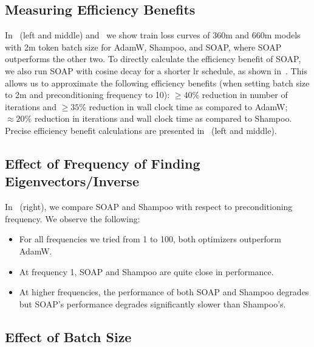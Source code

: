 \documentclass{article} %
\begin{document}
\subsection{Measuring Efficiency Benefits}



In~ (left and middle) and~ we show train loss curves of 360m and 660m models with 2m token batch size for AdamW, Shampoo, and SOAP, where SOAP outperforms the other two. To directly calculate the efficiency benefit of SOAP, we also run SOAP with cosine decay for a shorter lr schedule, as shown in~. This allows us to approximate the following efficiency benefits (when setting batch size to 2m and preconditioning frequency to 10): $\geq 40\%$ reduction in number of iterations and $\geq 35\%$ reduction in wall clock time as compared to AdamW; $\approx 20\%$ reduction in iterations and wall clock time as compared to Shampoo. Precise efficiency benefit calculations are presented in ~(left and middle).




\subsection{Effect of Frequency of Finding Eigenvectors/Inverse}
\label{sec:freq}


In~ (right), we compare SOAP and Shampoo with respect to preconditioning frequency. We observe the following: 
\begin{itemize}
	\item For all frequencies we tried from 1 to 100, both optimizers outperform AdamW.
	\item At frequency 1, SOAP and Shampoo are quite close in performance.
	\item At higher frequencies, the performance of  both SOAP and Shampoo degrades but SOAP's performance degrades significantly slower than Shampoo's.
\end{itemize} 


\subsection{Effect of Batch Size}
\label{sec:smallbsz}
\end{document}

